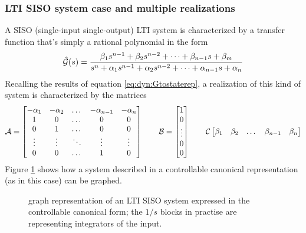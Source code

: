 		\subsubsection{LTI SISO system case and multiple realizations}		
		 A SISO (single-input single-output) LTI system is characterized by a transfer function that's simply a rational polynomial in the form
		\[ \hat {\mathcal{G}}(s) = \frac{\beta_1 s^{n-1} + \beta_2 s^{n-2} + \dots + \beta_{n-1} s + \beta_ m}{s^n + \alpha_1 s^{n-1} + \alpha_2 s^{n-2}+ \dots + \alpha_{n-1} s + \alpha_n } \]
		Recalling the results of equation \ref{eq:dyn:Gtostaterep}, a realization of this kind of system is characterized by the matrices
		\[ \mathcal{A} = \begin{bmatrix} -\alpha_1 & - \alpha_2 & \dots & - \alpha_{n-1} & - \alpha_n \\
		1 & 0 & \dots & 0 & 0 \\
		0 & 1 & \dots & 0 & 0 \\ 
		\vdots & \vdots & \ddots & \vdots & \vdots \\
		0 & 0 & \dots & 1 & 0  \end{bmatrix} \qquad \mathcal{B} = \begin{bmatrix} 1 \\ 0 \\ \vdots \\ 0 \\ 0 \end{bmatrix} \qquad \mathcal{C} \begin{bmatrix} \beta_1 & \beta_2 & \dots & \beta_{n-1} & \beta_n \end{bmatrix} \]
		Figure \ref{fig:dyn:controllablecanonical} shows how a system described in a controllable canonical representation (as in this case) can be graphed.
		
		\begin{figure}[bht]
			\centering {}
				\caption{graph representation of an LTI SISO system expressed in the controllable canonical form; the $1/s$ blocks in practise are representing integrators of the input.} \label{fig:dyn:controllablecanonical}
		\end{figure}
		
